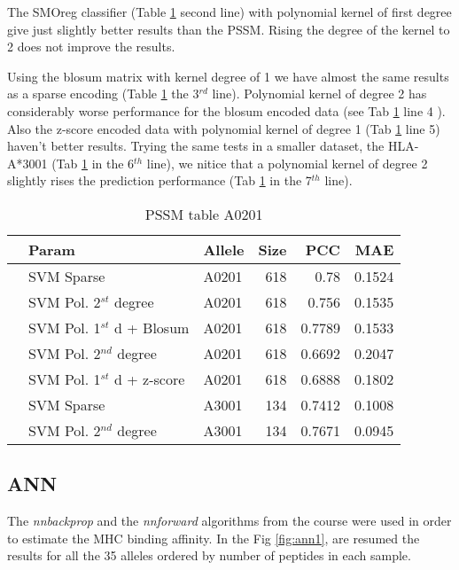 The SMOreg classifier (Table \ref{tab:svm1} second line) with polynomial kernel of first degree give just slightly better results than the PSSM. Rising the degree of the kernel to 2 does not improve the results.

Using the blosum matrix with kernel degree of 1 we have almost the same results as a sparse encoding (Table \ref{tab:svm1} the 3$^{rd}$ line). Polynomial kernel of degree 2 has considerably worse performance for the blosum encoded data (see Tab \ref{tab:svm1} line 4 ). Also the z-score encoded data with polynomial kernel of degree 1 (Tab \ref{tab:svm1} line 5) haven't better results.
Trying the same tests in a smaller dataset, the HLA-A*3001 (Tab \ref{tab:svm1} in the 6$^{th}$ line), we nitice that a polynomial kernel of degree 2 slightly rises the prediction performance (Tab \ref{tab:svm1} in the 7$^{th}$ line).

\begin{table}[ht]
\begin{center}
\begin{tabular}{rllrrr}
  \hline
 & Param & Allele & Size & PCC & MAE \\ 
  \hline
 & SVM Sparse & A0201 &   618 & 0.78 & 0.1524 \\ 
 & SVM Pol. 2$^{st}$ degree & A0201 &   618 & 0.756 & 0.1535 \\ 
 & SVM Pol. 1$^{st}$ d + Blosum & A0201 &   618 & 0.7789 & 0.1533 \\ 
 & SVM Pol. 2$^{nd}$ degree & A0201 &   618 & 0.6692 & 0.2047 \\ 
 & SVM Pol. 1$^{st}$ d + z-score & A0201 &   618 & 0.6888 & 0.1802 \\ 
 & SVM Sparse & A3001 &   134 & 0.7412 & 0.1008 \\ 
 & SVM Pol. 2$^{nd}$ degree & A3001 &   134 & 0.7671 & 0.0945 \\ 
   \hline
\end{tabular}
\end{center}
\caption{PSSM table A0201}\label{tab:svm1}
\end{table}


\subsection*{ANN}



The \textit{nnbackprop} and the \textit{nnforward} algorithms from the course were used in order to estimate the MHC binding affinity.
In the Fig \ref{fig:ann1}, are resumed the results for all the 35 alleles ordered by number of peptides in each sample.

